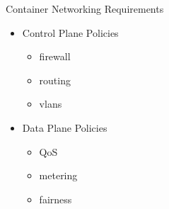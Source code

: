 \documentclass{beamer}
\begin{document}
\begin{frame}{Container Networking Requirements}
    \begin{itemize}
        \item Control Plane Policies
            \begin{itemize}
                \item firewall
                \item routing
                \item vlans
            \end{itemize}
        \item Data Plane Policies
            \begin{itemize}
                \item QoS
                \item metering
                \item fairness
            \end{itemize}
    \end{itemize}

\end{frame}
\end{document}
